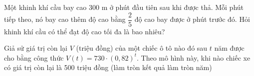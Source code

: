 \begin{ex}%
	Một khinh khí cầu bay cao $300$ m ở phút đầu tiên sau khi được thả. Mỗi phút tiếp theo, nó bay cao 
thêm độ cao bằng $\dfrac{2}{5}$ độ cao bay được ở phút trước đó. Hỏi khinh khí cầu có thể đạt độ cao tối đa là bao nhiêu?
\end{ex}

\begin{ex}%
Giả sử giá trị còn lại $V$ (triệu đồng) của một chiếc ô tô nào đó sau $t$ năm được cho bằng công thức $V(t) = 730 \cdot (0,82)^t$. Theo mô hình này, khi nào chiếc xe có giá trị còn lại là 500 triệu đồng (làm tròn kết quả làm tròn năm)\\
\end{ex}

